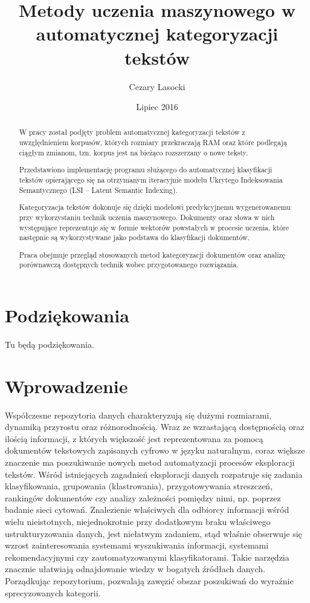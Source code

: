 \documentclass{pracamgr}
\author{Cezary Lasocki}
\title{Metody uczenia maszynowego w automatycznej kategoryzacji tekstów}
\date{Lipiec 2016}
\begin{document}
\maketitle

\begin{abstract}

W pracy został podjęty problem automatycznej kategoryzacji tekstów z uwzględnieniem korpusów, których rozmiary przekraczają RAM oraz które podlegają ciągłym zmianom, tzn. korpus jest na bieżąco rozszerzany o nowe teksty.

Przedstawiono implementację programu służącego do automatycznej klasyfikacji tekstów opierającego się na otrzymanym iteracyjnie modelu Ukrytego Indeksowania Semantycznego (LSI – Latent Semantic Indexing). 

Kategoryzacja tekstów dokonuje się dzięki modelowi predykcyjnemu wygenerowanemu przy wykorzystaniu technik uczenia maszynowego. Dokumenty oraz słowa w nich występujące reprezentuje się w formie wektorów powstałych w procesie uczenia, które następnie są wykorzystywane jako podstawa do klasyfikacji dokumentów.

Praca obejmuje przegląd stosowanych metod kategoryzacji dokumentów oraz analizę porównawczą dostępnych technik wobec przygotowanego rozwiązania.
\end{abstract}

\chapter*{Podziękowania}

Tu będą podziękowania.

\tableofcontents

\chapter{Wprowadzenie}

Współczesne repozytoria danych charakteryzują się dużymi rozmiarami, dynamiką przyrostu oraz różnorodnością. Wraz ze wzrastającą dostępnością oraz ilością informacji, z których większość jest reprezentowana za pomocą dokumentów tekstowych zapisanych cyfrowo w języku naturalnym, coraz większe znaczenie ma poszukiwanie nowych metod automatyzacji procesów eksploracji tekstów. Wśród istniejących zagadnień eksploracji danych rozpatruje się zadania klasyfikowania, grupowania (klastrowania), przygotowywania streszczeń, rankingów dokumentów czy analizy zależności pomiędzy nimi, np. poprzez badanie sieci cytowań. Znalezienie właściwych dla odbiorcy informacji wśród wielu nieistotnych, niejednokrotnie przy dodatkowym braku właściwego ustrukturyzowania danych, jest niełatwym zadaniem, stąd właśnie obserwuje się wzrost zainteresowania systemami wyszukiwania informacji, systemami rekomendacyjnymi czy zautomatyzowanymi klasyfikatorami. Takie narzędzia znacznie ułatwiają odnajdowanie wiedzy w bogatych źródłach danych. Porządkując repozytorium, pozwalają zawęzić obszar poszukiwań do wyraźnie sprecyzowanych kategorii. 
\end{document}
